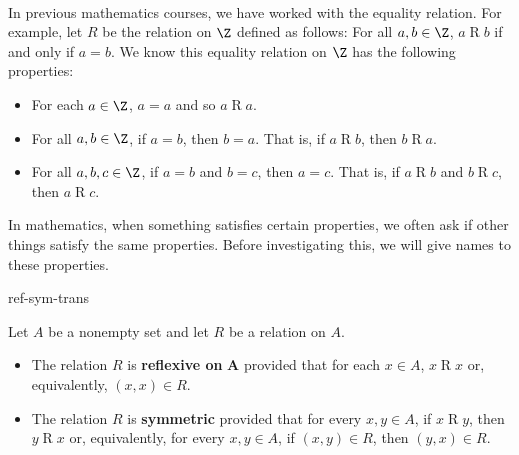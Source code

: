 \begin{previewactivity} \label{PA:propsofrelaitons} \hfill \\
In previous mathematics courses, we have worked with the equality relation.  For example, let $R$ be the relation on $\Z$ defined as follows:  For all $a, b \in \Z$,  $a \mathrel{R} b$ if and only if $a = b$.  We know this equality relation on $\Z$ has the following properties:
\begin{itemize}
  \item For each $a \in \Z$, $a = a$ and so $a \mathrel{R} a$.
  \item For all $a, b \in \Z$, if $a = b$, then $b = a$.  That is, if $a \mathrel{R} b$, then $b \mathrel{R} a$.
  \item For all $a, b, c \in \Z$, if $a = b$ and $b = c$, then $a = c$.  That is, if $a \mathrel{R} b$ and 
         $b \mathrel{R} c$, then $a \mathrel{R} c$.
\end{itemize}
In mathematics, when something satisfies certain properties, we often ask if other things satisfy the same properties.  Before investigating this, we will give names to these properties.


\begin{defbox}{ref-sym-trans}{Let  $A$  be a nonempty set and let  $R$  be a relation on  $A$.
\begin{itemize}
\item The relation  $R$  is \textbf{reflexive on}
%
%
 $\boldsymbol{A}$  provided that for each  
$x \in A$,  $x \mathrel{R} x$ or, equivalently,  $\left( {x, x} \right) \in R$.

\item The relation  $R$  is \textbf{symmetric}
%
%
  provided that for every  $x, y \in A$,  if  
$x \mathrel{R} y$, then  $y \mathrel{R} x$ or, equivalently, for every  $x, y \in A$,  if  $\left( {x, y} \right) \in R$, then  $\left( {y, x} \right) \in R$.


\end{itemize}}
\end{defbox}
\end{previewactivity}
